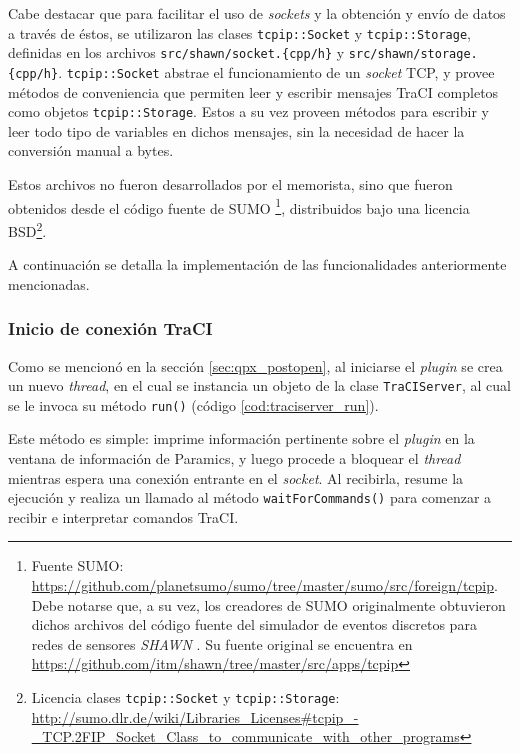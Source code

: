 Cabe destacar que para facilitar el uso de \emph{sockets} y la obtención y envío de datos a través de éstos, se utilizaron las clases \texttt{tcpip::Socket} y \texttt{tcpip::Storage}, definidas en los archivos \texttt{src/shawn/socket.\{cpp/h\}} y \texttt{src/shawn/storage.\{cpp/h\}}. \texttt{tcpip::Socket} abstrae el funcionamiento de un \textit{socket} TCP, y provee métodos de conveniencia que permiten leer y escribir mensajes TraCI completos como objetos \texttt{tcpip::Storage}. Estos a su vez proveen métodos para escribir y leer todo tipo de variables en dichos mensajes, sin la necesidad de hacer la conversión manual a bytes.

Estos archivos no fueron desarrollados por el memorista, sino que fueron obtenidos desde el código fuente de SUMO \footnote{Fuente SUMO: \url{https://github.com/planetsumo/sumo/tree/master/sumo/src/foreign/tcpip}. Debe notarse que, a su vez, los creadores de SUMO originalmente obtuvieron dichos archivos del código fuente del simulador de eventos discretos para redes de sensores \emph{SHAWN} \cite{kroller2005shawn}. Su fuente original se encuentra en \url{https://github.com/itm/shawn/tree/master/src/apps/tcpip}}, distribuidos bajo una licencia BSD\footnote{Licencia clases \texttt{tcpip::Socket} y \texttt{tcpip::Storage}: \url{http://sumo.dlr.de/wiki/Libraries_Licenses\#tcpip_-_TCP.2FIP_Socket_Class_to_communicate_with_other_programs}}.

A continuación se detalla la implementación de las funcionalidades anteriormente mencionadas.

\subsubsection{Inicio de conexión TraCI}

Como se mencionó en la sección \ref{sec:qpx_postopen}, al iniciarse el \emph{plugin} se crea un nuevo \emph{thread}, en el cual se instancia un objeto de la clase \texttt{TraCIServer}, al cual se le invoca su método \texttt{run()} (código \ref{cod:traciserver_run}).



Este método es simple: imprime información pertinente sobre el \emph{plugin} en la ventana de información de Paramics, y luego procede a bloquear el \emph{thread} mientras espera una conexión entrante en el \emph{socket}. Al recibirla, resume la ejecución y realiza un llamado al método \texttt{waitForCommands()} para comenzar a recibir e interpretar comandos TraCI.

